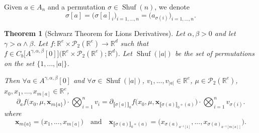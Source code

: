 \documentclass[a4paper,11pt,twoside]{article}
\numberwithin{equation}{section}
\theoremstyle{plain}
\newtheorem{theorem}{Theorem}[section]
\newcommand{\bR}{\mathbb{R}}
\newcommand{\cP}{\mathcal{P}}
\DeclareMathOperator{\Shuf}{Shuf}
\newcommand{\1}{\mathbbm{1}}
\begin{document}
	Given $a\in A_n$ and a permutation $\sigma \in \Shuf(n)$, we denote
	$$
	\sigma[a] = \big( \sigma[a]_i \big)_{i=1, ..., n} = \big( a_{\sigma(i)} \big)_{i=1, ..., n}. 
	$$
	
	\begin{theorem}[Schwarz Theorem for Lions Derivatives]
		\label{thm:Schwarz-Lions}
		Let $\alpha, \beta>0$ and let $\gamma>\alpha\wedge \beta$. Let $f: \bR^e \times \cP_2(\bR^e) \to \bR^d$ such that $f\in C_b\big[ A^{\gamma, \alpha, \beta}[0] \big]\big( \bR^e\times \cP_2(\bR^e); \bR^d \big)$. Let $\Shuf(|a|)$ be the set of permutations on the set $\{1, ..., |a| \}$. 
		
		Then $\forall a\in A^{\gamma, \alpha, \beta}[0]$ and $\forall \sigma\in \Shuf(|a|)$, $v_1, ..., v_{|a|} \in \bR^e$, $\mu\in \cP_2(\bR^e)$, $x_0, x_1, ..., x_{m[a]} \in \bR^e$, 
		\begin{equation}
			\label{eq:proposition:Schwartz-2}
			\partial_{a} f\Big( x_0, \mu, \boldsymbol{x}_{m\{a\}} \Big) \cdot \bigotimes_{i=1}^n v_i 
			=
			\partial_{\llbracket \sigma[a]\rrbracket_0} f\Big( x_0, \mu, \boldsymbol{x}_{\llbracket \sigma(a)\rrbracket_0 \circ (a)} \Big) \cdot \bigotimes_{i=1}^n v_{\sigma(i)} . 
		\end{equation}
		where
		\begin{equation*}
			\boldsymbol{x}_{m\{a\}} = \Big( x_1, ..., x_{m[a]} \Big)
			\quad \mbox{and}\quad 
			\boldsymbol{x}_{\llbracket \sigma(a)\rrbracket_0 \circ (a)} = \Big( x_{\sigma(a)_{a^{-1}[1]}}, ..., x_{\sigma(a)_{a^{-1}[m[a]]}} \Big). 
		\end{equation*}
	\end{theorem}
	
\end{document}
